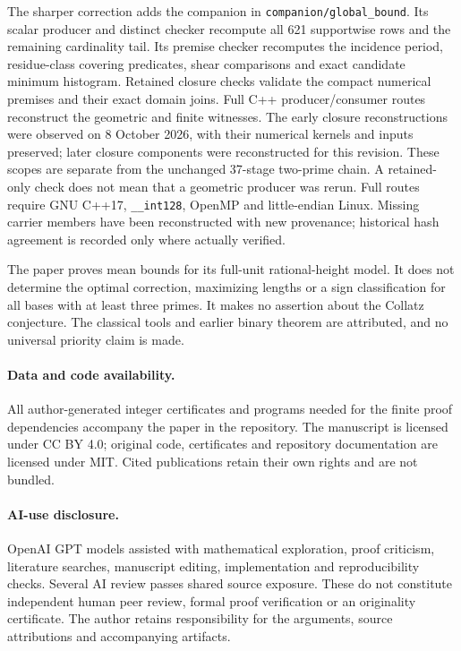 \documentclass[11pt]{article}
\theoremstyle{definition}\newtheorem{definition}[theorem]{Definition}
\theoremstyle{remark}\newtheorem{remark}[theorem]{Remark}
\begin{document}
The sharper correction adds the companion in \texttt{companion/global\_bound}.
Its scalar producer and distinct checker recompute all 621 supportwise rows
and the remaining cardinality tail. Its premise checker recomputes the
incidence period, residue-class covering predicates, shear comparisons
and exact candidate minimum histogram. Retained closure checks validate
the compact numerical premises and their exact domain joins. Full C++
producer/consumer routes reconstruct the geometric and finite witnesses.
The early closure reconstructions were observed on 8 October 2026, with
their numerical kernels and inputs preserved; later closure components
were reconstructed for this revision. These scopes are separate from the
unchanged 37-stage two-prime chain. A retained-only check does not mean
that a geometric producer was rerun. Full routes require GNU C++17,
\texttt{\_\_int128}, OpenMP and little-endian Linux.
Missing carrier members have been reconstructed with new provenance;
historical hash agreement is recorded only where actually verified.

The paper proves mean bounds for its full-unit rational-height model.
It does not determine the optimal correction, maximizing lengths or a
sign classification for all bases with at least three primes.
It makes no assertion about the Collatz conjecture. The classical tools
and earlier binary theorem are attributed, and no universal priority
claim is made.

\paragraph{Data and code availability.}
All author-generated integer certificates and programs needed for the
finite proof dependencies accompany the paper in the repository.
The manuscript is licensed under CC BY 4.0; original code, certificates
and repository documentation are licensed under MIT. Cited publications
retain their own rights and are not bundled.

\paragraph{AI-use disclosure.}
OpenAI GPT models assisted with mathematical exploration, proof criticism,
literature searches, manuscript editing, implementation and reproducibility
checks. Several AI review passes shared source exposure. These do not
constitute independent human peer review, formal proof verification or an
originality certificate. The author retains responsibility for the arguments,
source attributions and accompanying artifacts.
\end{document}
